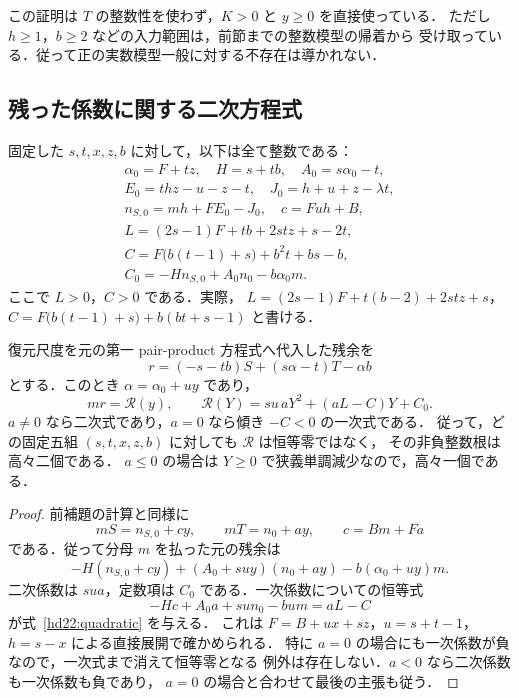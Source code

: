 この証明は $T$ の整数性を使わず，$K>0$ と $y\ge0$ を直接使っている．
ただし $h\ge1$，$b\ge2$ などの入力範囲は，前節までの整数模型の帰着から
受け取っている．従って正の実数模型一般に対する不存在は導かれない．

\subsection{残った係数に関する二次方程式}

固定した $s,t,x,z,b$ に対して，以下は全て整数である：
\begin{equation}\label{hd22:quadratic-data}
 \begin{gathered}
 \alpha_0=F+tz,\quad H=s+tb,\quad A_0=s\alpha_0-t,\\
 E_0=thz-u-z-t,\quad J_0=h+u+z-\lambda t,\\
 n_{S,0}=mh+FE_0-J_0,\quad c=Fuh+B,\\
 L=(2s-1)F+tb+2stz+s-2t,\\
 C=F\bigl(b(t-1)+s\bigr)+b^2t+bs-b,\\
 C_0=-Hn_{S,0}+A_0n_0-b\alpha_0m.
 \end{gathered}
\end{equation}
ここで $L>0$，$C>0$ である．実際，
$L=(2s-1)F+t(b-2)+2stz+s$，
$C=F\bigl(b(t-1)+s\bigr)+b(bt+s-1)$ と書ける．

\begin{proposition}[恒等零とならない残余多項式]
\label{hd22:residual-quadratic}
復元尺度を元の第一 pair-product 方程式へ代入した残余を
\[
 r=(-s-tb)S+(s\alpha-t)T-\alpha b
\]
とする．このとき $\alpha=\alpha_0+uy$ であり，
\begin{equation}\label{hd22:quadratic}
 mr=\mathcal R(y),\qquad
 \mathcal R(Y)=su\,aY^2+(aL-C)Y+C_0.
\end{equation}
$a\ne0$ なら二次式であり，$a=0$ なら傾き $-C<0$ の一次式である．
従って，どの固定五組 $(s,t,x,z,b)$ に対しても $\mathcal R$ は恒等零ではなく，
その非負整数根は高々二個である．
$a\le0$ の場合は $Y\ge0$ で狭義単調減少なので，高々一個である．
\end{proposition}

\begin{proof}
前補題の計算と同様に
\[
 mS=n_{S,0}+cy,\qquad mT=n_0+ay,\qquad
 c=Bm+Fa
\]
である．従って分母 $m$ を払った元の残余は
\[
 -H(n_{S,0}+cy)+(A_0+suy)(n_0+ay)
 -b(\alpha_0+uy)m.
\]
二次係数は $sua$，定数項は $C_0$ である．一次係数についての恒等式
\begin{equation}\label{hd22:linear-coefficient}
 -Hc+A_0a+sun_0-bum=aL-C
\end{equation}
が式~\eqref{hd22:quadratic} を与える．
これは $F=B+ux+sz$，$u=s+t-1$，$h=s-x$ による直接展開で確かめられる．
特に $a=0$ の場合にも一次係数が負なので，一次式まで消えて恒等零となる
例外は存在しない．$a<0$ なら二次係数も一次係数も負であり，
$a=0$ の場合と合わせて最後の主張も従う．
\end{proof}

